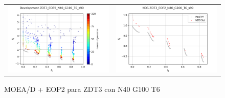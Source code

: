 \begin{figure}[H]
\begin{tabular}{c c}
    \includegraphics[scale=0.5]{figures/ZDT3_EOP2_N40_G100_T6/s99_dev.png} &
    \includegraphics[scale=0.5]{figures/ZDT3_EOP2_N40_G100_T6/s99_nds.png}\\
    \end{tabular}
    \caption{MOEA/D + EOP2 para ZDT3 con N40 G100 T6 }
    \label{fig:12}
\end{figure}

